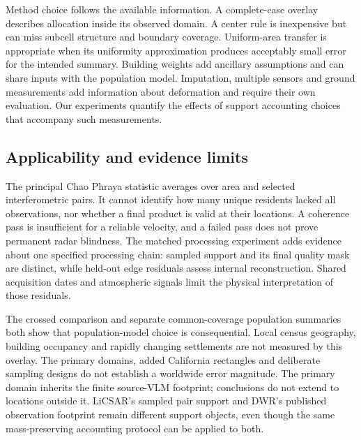 \documentclass[pdflatex,lineno,sn-nature]{sn-jnl}
\begin{document}
Method choice follows the available information. A complete-case overlay describes allocation inside its observed domain. A center rule is inexpensive but can miss subcell structure and boundary coverage. Uniform-area transfer is appropriate when its uniformity approximation produces acceptably small error for the intended summary. Building weights add ancillary assumptions and can share inputs with the population model. Imputation, multiple sensors and ground measurements add information about deformation and require their own evaluation. Our experiments quantify the effects of support accounting choices that accompany such measurements.

\subsection{Applicability and evidence limits}
The principal Chao Phraya statistic averages over area and selected interferometric pairs. It cannot identify how many unique residents lacked all observations, nor whether a final product is valid at their locations. A coherence pass is insufficient for a reliable velocity, and a failed pass does not prove permanent radar blindness. The matched processing experiment adds evidence about one specified processing chain: sampled support and its final quality mask are distinct, while held-out edge residuals assess internal reconstruction. Shared acquisition dates and atmospheric signals limit the physical interpretation of those residuals.

The crossed comparison and separate common-coverage population summaries both show that population-model choice is consequential. Local census geography, building occupancy and rapidly changing settlements are not measured by this overlay. The primary domains, added California rectangles and deliberate sampling designs do not establish a worldwide error magnitude. The primary domain inherits the finite source-VLM footprint; conclusions do not extend to locations outside it. LiCSAR's sampled pair support and DWR's published observation footprint remain different support objects, even though the same mass-preserving accounting protocol can be applied to both.
\end{document}
